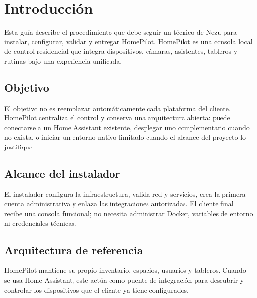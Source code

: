 \section{Introducción}

Esta guía describe el procedimiento que debe seguir un técnico de Nezu para instalar, configurar, validar y entregar HomePilot. HomePilot es una consola local de control residencial que integra dispositivos, cámaras, asistentes, tableros y rutinas bajo una experiencia unificada.

\subsection{Objetivo}
El objetivo no es reemplazar automáticamente cada plataforma del cliente. HomePilot centraliza el control y conserva una arquitectura abierta: puede conectarse a un Home Assistant existente, desplegar uno complementario cuando no exista, o iniciar un entorno nativo limitado cuando el alcance del proyecto lo justifique.

\subsection{Alcance del instalador}
El instalador configura la infraestructura, valida red y servicios, crea la primera cuenta administrativa y enlaza las integraciones autorizadas. El cliente final recibe una consola funcional; no necesita administrar Docker, variables de entorno ni credenciales técnicas.

\subsection{Arquitectura de referencia}
\begin{center}
\end{center}

\begin{tcolorbox}[title=Principio operativo]
HomePilot mantiene su propio inventario, espacios, usuarios y tableros. Cuando se usa Home Assistant, este actúa como puente de integración para descubrir y controlar los dispositivos que el cliente ya tiene configurados.
\end{tcolorbox}
